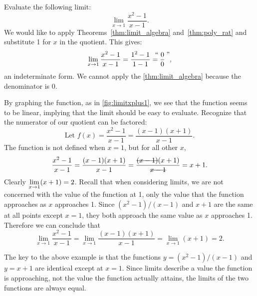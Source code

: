 \begin{example}\label{ex_limit_onept}%
Evaluate the following limit:\vspace{-.3\baselineskip}
\[\lim_{x\to 1}\frac{x^2-1}{x-1}.\]
\solution
We would like to apply Theorems~\ref{thm:limit_algebra} and~\ref{thm:poly_rat} and substitute 1 for $x$ in the quotient. This gives:
\[\lim_{x\to 1}\frac{x^2-1}{x-1} = \frac{1^2-1}{1-1} = \zerooverzero,\]
an indeterminate form. We cannot apply the \autoref{thm:limit_algebra} because the denominator is 0.


By graphing the function, as in \autoref{fig:limitxplus1}, we see that the function seems to be linear, implying that the limit should be easy to evaluate. Recognize that the numerator of our quotient can be factored:
\[\text{Let \ } f(x)=\frac{x^2-1}{x-1} = \frac{(x-1)(x+1)}{x-1}.\]
The function is not defined when $x=1$, but for all other $x$,
\[\frac{x^2-1}{x-1} = \frac{(x-1)(x+1)}{x-1} = \frac{\hbox{\sout{$(x-1)$}}(x+1)}{\hbox{\sout{$x-1$}}}= x+1.\]
Clearly $\displaystyle\lim_{x\to 1}(x+1)=2$. Recall that when considering limits, we are not concerned with the value of the function at 1, only the value that the function approaches as $x$ approaches 1. Since $(x^2-1)/(x-1)$ and $x+1$ are the same at all points except $x=1$, they both approach the same value as $x$ approaches 1. Therefore we can conclude that
\[\lim_{x\to 1}\frac{x^2-1}{x-1}=\lim_{x\to 1}\frac{(x-1)(x+1)}{x-1}=\lim_{x\to 1} (x+1)=2.\]
\end{example}

The key to the above example is that the functions $y=(x^2-1)/(x-1)$ and $y=x+1$ are identical except at $x=1$. Since limits describe a value the function is approaching, not the value the function actually attains, the limits of the two functions are always equal.

